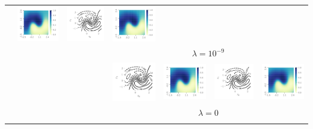 \documentclass{article}
\theoremstyle{definition}
\begin{document}
\begin{table}
\begin{tabular}{@{}c@{}c@{}c@{}c@{}c@{}c@{}c@{}}
&
\includegraphics[height=0.13\textwidth]{img/moon/moon_random_eubo_prob_1e-09.pdf}
&
\includegraphics[trim={7mm 8mm 3mm 3mm}, clip,height=0.13\textwidth]{img/moon/moon_random_elbo_meanf_1e-09.pdf}
&
\includegraphics[height=0.13\textwidth]{img/moon/moon_random_elbo_prob_1e-09.pdf}
\\
& & &
\multicolumn{4}{c}{$\lambda = 10^{-9}$}
\\
& & &
\includegraphics[trim={7mm 8mm 3mm 3mm}, clip,height=0.13\textwidth]{img/moon/moon_random_eubo_meanf_0_0.pdf}
&
\includegraphics[height=0.13\textwidth]{img/moon/moon_random_eubo_prob_0_0.pdf}
&
\includegraphics[trim={7mm 8mm 3mm 3mm}, clip,height=0.13\textwidth]{img/moon/moon_random_elbo_meanf_0_0.pdf}
&
\includegraphics[height=0.13\textwidth]{img/moon/moon_random_elbo_prob_0_0.pdf}
\\
& & & 
\multicolumn{4}{c}{$\lambda = 0$}\\
\midrule
\multirow[t]{4}{*}{
}
\end{tabular}
\end{table}
\end{document}
